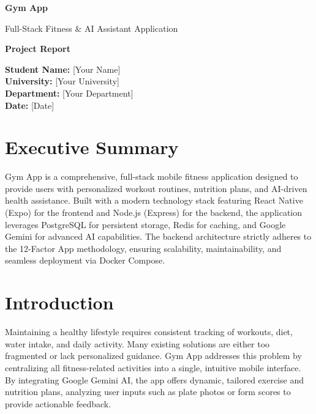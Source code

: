 \documentclass[12pt,a4paper]{article}
\begin{document}
\begin{titlepage}
    \centering
    \vspace*{2cm}
    
    {\Huge\bfseries Gym App\par}
    \vspace{0.5cm}
    {\Large Full-Stack Fitness \& AI Assistant Application\par}
    
    \vspace{2cm}
    
    {\Large\bfseries Project Report\par}
    
    \vspace{3cm}
    
    \begin{flushleft}
        \large
        \textbf{Student Name:} [Your Name] \\
        \textbf{University:} [Your University] \\
        \textbf{Department:} [Your Department] \\
        \textbf{Date:} [Date]
    \end{flushleft}
    
    \vfill
\end{titlepage}

\tableofcontents
\newpage

\section{Executive Summary}
Gym App is a comprehensive, full-stack mobile fitness application designed to provide users with personalized workout routines, nutrition plans, and AI-driven health assistance. Built with a modern technology stack featuring React Native (Expo) for the frontend and Node.js (Express) for the backend, the application leverages PostgreSQL for persistent storage, Redis for caching, and Google Gemini for advanced AI capabilities. The backend architecture strictly adheres to the 12-Factor App methodology, ensuring scalability, maintainability, and seamless deployment via Docker Compose.

\section{Introduction}
Maintaining a healthy lifestyle requires consistent tracking of workouts, diet, water intake, and daily activity. Many existing solutions are either too fragmented or lack personalized guidance. Gym App addresses this problem by centralizing all fitness-related activities into a single, intuitive mobile interface. By integrating Google Gemini AI, the app offers dynamic, tailored exercise and nutrition plans, analyzing user inputs such as plate photos or form scores to provide actionable feedback.
\end{document}
